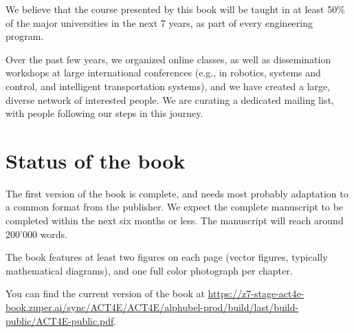 \documentclass[10pt, article, one side]{memoir}
\begin{document}
    We believe that the course presented by this book will be taught in at least 50\% of the major universities in the next 7 years, as part of every engineering program.

    Over the past few years, we organized online classes, as well as dissemination workshops at large international conferences (e.g., in robotics, systems and control, and intelligent transportation systems), and we have created a large, diverse network of interested people.
    We are curating a dedicated mailing list, with people following our steps in this journey.

    \section{Status of the book}
    The first version of the book is complete, and needs most probably adaptation to a common format from the publisher.
    We expect the complete manuscript to be completed within the next six months or less.
    The manuscript will reach around 200’000 words.

    The book features at least two figures on each page (vector figures, typically mathematical diagrams), and one full color photograph per chapter.

    You can find the current version of the book at \href{https://z7-stage-act4e-book.zuper.ai/sync/ACT4E/ACT4E/alphubel-prod/build/last/build-public/ACT4E-public.pdf}{https://z7-stage-act4e-book.zuper.ai/sync/ACT4E/ACT4E/alphubel-prod/build/last/build-public/ACT4E-public.pdf}.
\end{document}
